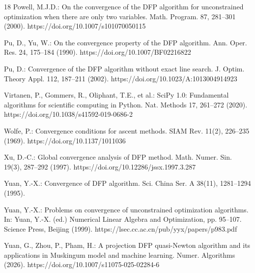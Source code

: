 \documentclass[11pt]{article}
\begin{document}
\begin{thebibliography}{18}
Powell, M.J.D.:
On the convergence of the DFP algorithm for unconstrained optimization when
there are only two variables.
Math. Program. 87, 281--301 (2000).
https://doi.org/10.1007/s101070050115

Pu, D., Yu, W.:
On the convergence property of the DFP algorithm.
Ann. Oper. Res. 24, 175--184 (1990).
https://doi.org/10.1007/BF02216822

Pu, D.:
Convergence of the DFP algorithm without exact line search.
J. Optim. Theory Appl. 112, 187--211 (2002).
https://doi.org/10.1023/A:1013004914923

Virtanen, P., Gommers, R., Oliphant, T.E., et al.:
SciPy 1.0: Fundamental algorithms for scientific computing in Python.
Nat. Methods 17, 261--272 (2020).
https://doi.org/10.1038/s41592-019-0686-2

Wolfe, P.:
Convergence conditions for ascent methods.
SIAM Rev. 11(2), 226--235 (1969).
https://doi.org/10.1137/1011036

Xu, D.-C.:
Global convergence analysis of DFP method.
Math. Numer. Sin. 19(3), 287--292 (1997).
https://doi.org/10.12286/jssx.1997.3.287

Yuan, Y.-X.:
Convergence of DFP algorithm.
Sci. China Ser. A 38(11), 1281--1294 (1995).

Yuan, Y.-X.:
Problems on convergence of unconstrained optimization algorithms.
In: Yuan, Y.-X. (ed.) Numerical Linear Algebra and Optimization,
pp. 95--107. Science Press, Beijing (1999).
https://lsec.cc.ac.cn/pub/yyx/papers/p983.pdf

Yuan, G., Zhou, P., Pham, H.:
A projection DFP quasi-Newton algorithm and its applications in Muskingum
model and machine learning.
Numer. Algorithms (2026).
https://doi.org/10.1007/s11075-025-02284-6



\end{thebibliography}
\end{document}
